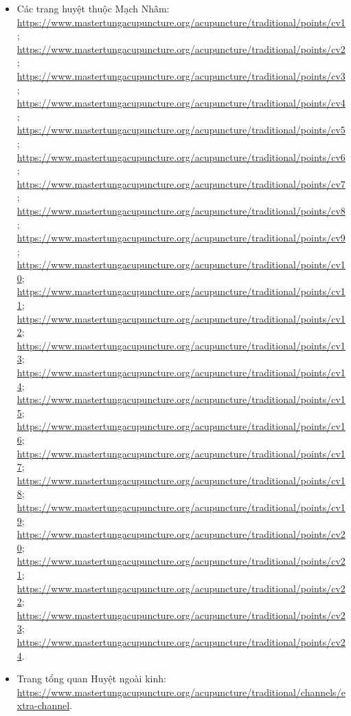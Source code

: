 \documentclass[12pt,a4paper]{article}
\begin{document}
\begin{itemize}
  \item Các trang huyệt thuộc Mạch Nhâm: \url{https://www.mastertungacupuncture.org/acupuncture/traditional/points/cv1}; \url{https://www.mastertungacupuncture.org/acupuncture/traditional/points/cv2}; \url{https://www.mastertungacupuncture.org/acupuncture/traditional/points/cv3}; \url{https://www.mastertungacupuncture.org/acupuncture/traditional/points/cv4}; \url{https://www.mastertungacupuncture.org/acupuncture/traditional/points/cv5}; \url{https://www.mastertungacupuncture.org/acupuncture/traditional/points/cv6}; \url{https://www.mastertungacupuncture.org/acupuncture/traditional/points/cv7}; \url{https://www.mastertungacupuncture.org/acupuncture/traditional/points/cv8}; \url{https://www.mastertungacupuncture.org/acupuncture/traditional/points/cv9}; \url{https://www.mastertungacupuncture.org/acupuncture/traditional/points/cv10}; \url{https://www.mastertungacupuncture.org/acupuncture/traditional/points/cv11}; \url{https://www.mastertungacupuncture.org/acupuncture/traditional/points/cv12}; \url{https://www.mastertungacupuncture.org/acupuncture/traditional/points/cv13}; \url{https://www.mastertungacupuncture.org/acupuncture/traditional/points/cv14}; \url{https://www.mastertungacupuncture.org/acupuncture/traditional/points/cv15}; \url{https://www.mastertungacupuncture.org/acupuncture/traditional/points/cv16}; \url{https://www.mastertungacupuncture.org/acupuncture/traditional/points/cv17}; \url{https://www.mastertungacupuncture.org/acupuncture/traditional/points/cv18}; \url{https://www.mastertungacupuncture.org/acupuncture/traditional/points/cv19}; \url{https://www.mastertungacupuncture.org/acupuncture/traditional/points/cv20}; \url{https://www.mastertungacupuncture.org/acupuncture/traditional/points/cv21}; \url{https://www.mastertungacupuncture.org/acupuncture/traditional/points/cv22}; \url{https://www.mastertungacupuncture.org/acupuncture/traditional/points/cv23}; \url{https://www.mastertungacupuncture.org/acupuncture/traditional/points/cv24}.
  \item Trang tổng quan Huyệt ngoài kinh: \url{https://www.mastertungacupuncture.org/acupuncture/traditional/channels/extra-channel}.

\end{itemize}
\end{document}
